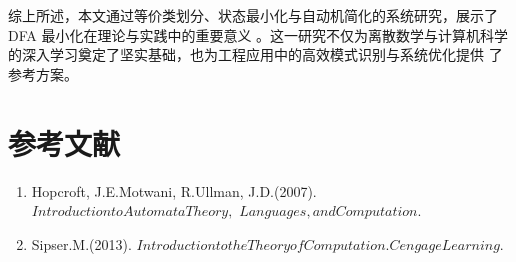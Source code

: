 \documentclass{article}
\begin{document}
综上所述，本文通过等价类划分、状态最小化与自动机简化的系统研究，展示了 DFA 最小化在理论与实践中的重要意义
。这一研究不仅为离散数学与计算机科学的深入学习奠定了坚实基础，也为工程应用中的高效模式识别与系统优化提供
了参考方案。



\newpage
\section{参考文献}
\begin{enumerate}
    \item Hopcroft, J.E.Motwani, R.Ullman, J.D.(2007). $Introduction to Automata Theory,$ \newline$Languages, and Computation.$
    \item Sipser.M.(2013). $Introduction to the Theory of Computation. Cengage Learning.$
\end{enumerate}
\end{document}
